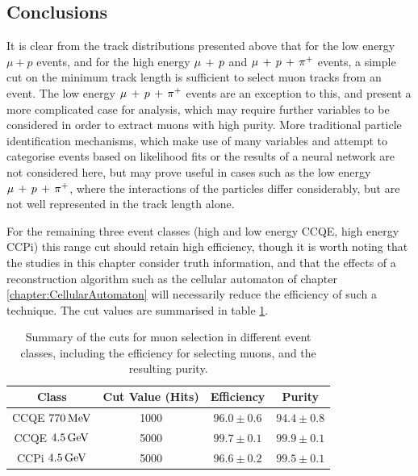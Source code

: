 \subsection{Conclusions}
It is clear from the track distributions presented above that for the low energy $\mu + p$ events, and for the high energy $\mu\,+\,p$ and $\mu\,+\,p\,+\,\pi^{+}$ events, a simple cut on the minimum track length is sufficient to select muon tracks from an event. The low energy $\mu\,+\,p\,+\,\pi^{+}$ events are an exception to this, and present a more complicated case for analysis, which may require further variables to be considered in order to extract muons with high purity. More traditional particle identification mechanisms, which make use of many variables and attempt to categorise events based on likelihood fits or the results of a neural network are not considered here, but may prove useful in cases such as the low energy $\mu\,+\,p\,+\,\pi^{+}$, where the interactions of the particles differ considerably, but are not well represented in the track length alone.

For the remaining three event classes (high and low energy CCQE, high energy \acs{CCPi}) this range cut should retain high efficiency, though it is worth noting that the studies in this chapter consider truth information, and that the effects of a reconstruction algorithm such as the cellular automaton of chapter \ref{chapter:CellularAutomaton} will necessarily reduce the efficiency of such a technique. The cut values are summarised in table \ref{table:summary_cuts}.

\begin{table}
\centering
\begin{tabular}{cccc}
Class & Cut Value (Hits) & Efficiency & Purity \\
\hline
\hline
CCQE $770\,\mathrm{MeV}$ & 1000 & $96.0\pm0.6$ & $94.4\pm0.8$ \\
CCQE $4.5\,\mathrm{GeV}$ & 5000 & $99.7\pm0.1$ & $99.9\pm0.1$ \\
\acs{CCPi} $4.5\,\mathrm{GeV}$ & 5000 & $96.6\pm0.2$ & $99.5\pm0.1$ \\
\hline
\end{tabular}
\caption[Summary of cuts with efficiencies and purities]{\label{table:summary_cuts}Summary of the cuts for muon selection in different event classes, including the efficiency for selecting muons, and the resulting purity.}
\end{table}
